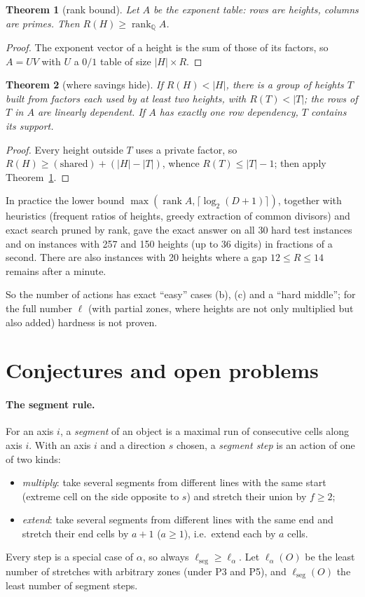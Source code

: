 \documentclass[11pt,a4paper]{article}
\theoremstyle{plain}
\newtheorem{theorem}{Theorem}
\theoremstyle{definition}
\theoremstyle{remark}
\begin{document}
\begin{theorem}[rank bound]\label{thm:rank}
Let $A$ be the exponent table: rows are heights, columns are primes. Then $R(H)\ge\operatorname{rank}_{\mathbb Q}A$.
\end{theorem}
\begin{proof}
The exponent vector of a height is the sum of those of its factors, so $A=UV$ with $U$ a $0/1$ table of size $|H|\times R$.
\end{proof}

\begin{theorem}[where savings hide]\label{thm:tree}
If $R(H)<|H|$, there is a group of heights $T$ built from factors each used by at least two heights, with $R(T)<|T|$; the rows of $T$ in $A$ are linearly dependent. If $A$ has exactly one row dependency, $T$ contains its support.
\end{theorem}
\begin{proof}
Every height outside $T$ uses a private factor, so $R(H)\ge(\text{shared})+(|H|-|T|)$, whence $R(T)\le|T|-1$; then apply Theorem~\ref{thm:rank}.
\end{proof}

In practice the lower bound $\max(\operatorname{rank}A,\lceil\log_2(D+1)\rceil)$, together with heuristics (frequent ratios of heights, greedy extraction of common divisors) and exact search pruned by rank, gave the exact answer on all 30 hard test instances and on instances with 257 and 150 heights (up to 36 digits) in fractions of a second. There are also instances with 20 heights where a gap $12\le R\le 14$ remains after a minute.

So the number of actions has exact ``easy'' cases (b), (c) and a ``hard middle''; for the full number $\ell$ (with partial zones, where heights are not only multiplied but also added) hardness is not proven.

\section{Conjectures and open problems}\label{sec:conj}

\paragraph{The segment rule.} For an axis $i$, a \emph{segment} of an object is a maximal run of consecutive cells along axis $i$. With an axis $i$ and a direction $s$ chosen, a \emph{segment step} is an action of one of two kinds:
\begin{itemize}
\item \emph{multiply}: take several segments from different lines with the same start (extreme cell on the side opposite to $s$) and stretch their union by $f\ge2$;
\item \emph{extend}: take several segments from different lines with the same end and stretch their end cells by $a+1$ ($a\ge1$), i.e.\ extend each by $a$ cells.
\end{itemize}
Every step is a special case of $\alpha$, so always $\ell_{\mathrm{seg}}\ge\ell_\alpha$. Let $\ell_{\alpha}(O)$ be the least number of stretches with arbitrary zones (under P3 and P5), and $\ell_{\mathrm{seg}}(O)$ the least number of segment steps.
\end{document}
